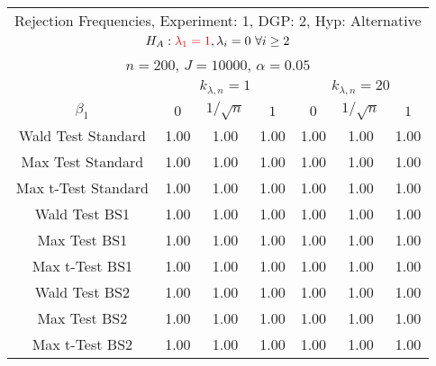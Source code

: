  \begin{table}[H] 
 \singlespacing 
 \small 
 \centering 
\begin{tabular}{c|ccc|ccc} 
\multicolumn{7}{c}{ Rejection Frequencies, Experiment: 1, DGP: 2, Hyp: Alternative } \\ 
\multicolumn{7}{c}{ $H_{A}: {\color{red} \lambda_{1} = 1}, \lambda_{i} = 0 \ \forall i\ge 2$ } \\
\multicolumn{7}{c}{ $n=200$, $J=10000$, $\alpha = 0.05$ } \\ 
  \multicolumn{1}{c}{} & \multicolumn{3}{c}{ $k_{\lambda,n}=1$ } & \multicolumn{3}{c}{ $k_{\lambda,n}=20$ } \\ 
 \hline 
 $\beta_{1}$ & $0$ & $1/\sqrt{n}$ &  $1$ & $0$ & $1/\sqrt{n}$  & $1$   \\ 
 \hline  
 \hline 
 Wald Test Standard  &  1.00 &  1.00 &  1.00 &  1.00 &  1.00 &  1.00 \\ 
 Max Test Standard &  1.00 &  1.00 &  1.00 &  1.00 &  1.00 &  1.00  \\ 
 Max t-Test Standard &  1.00 &  1.00 &  1.00 &  1.00 &  1.00 &  1.00  \\ 
 \hline  
 Wald Test BS1 &  1.00 &  1.00 &  1.00 &  1.00 &  1.00 &  1.00  \\ 
 Max Test BS1 &  1.00 &  1.00 &  1.00 &  1.00 &  1.00 &  1.00  \\ 
 Max t-Test BS1 &  1.00 &  1.00 &  1.00 &  1.00 &  1.00 &  1.00  \\ 
 \hline  
 Wald Test BS2 &  1.00 &  1.00 &  1.00 &  1.00 &  1.00 &  1.00  \\ 
 Max Test BS2 &  1.00 &  1.00 &  1.00 &  1.00 &  1.00 &  1.00  \\ 
 Max t-Test BS2 &  1.00 &  1.00 &  1.00 &  1.00 &  1.00 &  1.00  \\ 
 \hline  
\end{tabular}
 \end{table}
